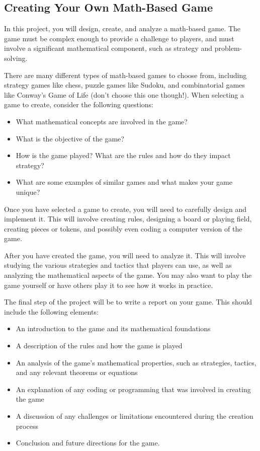 \documentclass{article}
\begin{document}
\pagebreak
\subsection*{Creating Your Own Math-Based Game}
In this project, you will design, create, and analyze a math-based game. The game must be complex enough to provide a challenge to players, and must involve a significant mathematical component, such as strategy and problem-solving.

\vspace{3mm}
There are many different types of math-based games to choose from, including strategy games like chess, puzzle games like Sudoku, and combinatorial games like Conway's Game of Life (don't choose this one though!). When selecting a game to create, consider the following questions:

\begin{itemize}
\item What mathematical concepts are involved in the game?
\item What is the objective of the game?
\item How is the game played? What are the rules and how do they impact strategy?
\item What are some examples of similar games and what makes your game unique?
\end{itemize}

\vspace{3mm}
Once you have selected a game to create, you will need to carefully design and implement it. This will involve creating rules, designing a board or playing field, creating pieces or tokens, and possibly even coding a computer version of the game.

\vspace{3mm}
After you have created the game, you will need to analyze it. This will involve studying the various strategies and tactics that players can use, as well as analyzing the mathematical aspects of the game. You may also want to play the game yourself or have others play it to see how it works in practice.

\vspace{3mm}
The final step of the project will be to write a report on your game. This should include the following elements:

\begin{itemize}
\item An introduction to the game and its mathematical foundations
\item A description of the rules and how the game is played
\item An analysis of the game's mathematical properties, such as strategies, tactics, and any relevant theorems or equations
\item An explanation of any coding or programming that was involved in creating the game
\item A discussion of any challenges or limitations encountered during the creation process
\item Conclusion and future directions for the game.
\end{itemize}
\end{document}
